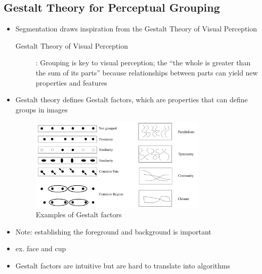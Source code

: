 \documentclass[letterpaper,12pt]{article}
\begin{document}
\subsection{Gestalt Theory for Perceptual Grouping}
\begin{itemize}
 \item Segmentation draws inspiration from the Gestalt Theory of Visual Perception
       \begin{description}
        \item[Gestalt Theory of Visual Perception]: Grouping is key to visual perception; the ``the whole is greater than the sum of its parts'' because relationships between parts can yield new properties and features
       \end{description}
 \item Gestalt theory defines Gestalt factors, which are properties that can define groups in images
       \begin{figure}
        \centering
        \includegraphics[width=0.8\textwidth]{images/gestalt-factors.png}
        \caption{Examples of Gestalt factors}
       \end{figure}
 \item Note: establishing the foreground and background is important
 \item ex. face and cup
 \item Gestalt factors are intuitive but are hard to translate into algorithms
\end{itemize}
\end{document}
